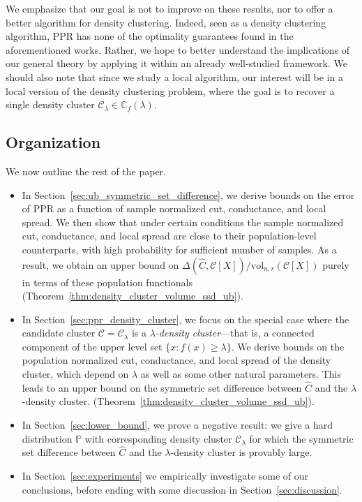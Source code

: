 \documentclass[11pt,twoside]{article}
\theoremstyle{definition}
\newcommand{\1}{\mathbf{1}}
\newcommand{\mc}[1]{\mathcal{#1}}
\newcommand{\Pbb}{\mathbb{P}}
\newcommand{\wh}[1]{\widehat{#1}}
\newcommand{\vol}{\mathrm{vol}}
\begin{document}
We emphasize that our goal is
not to improve on these results, nor to offer a better algorithm for density clustering. Indeed, seen as a density clustering algorithm, PPR has none 
of the optimality guarantees found in the aforementioned works. Rather, we hope to better understand the implications of our general theory by applying it within an already well-studied framework. We should also note that since we study a local algorithm, our interest will be in a local version of the density clustering problem, where the goal is to recover a single density cluster $\mc{C}_{\lambda} \in \mathbb{C}_f(\lambda)$. 

\subsection{Organization}
We now outline the rest of the paper.
\begin{itemize}
	\item In Section~\ref{sec:ub_symmetric_set_difference}, we derive bounds on the error of PPR as a function of sample normalized cut, conductance, and local spread. We then show that under certain conditions the sample normalized cut, conductance, and local spread are close to their population-level counterparts, with high probability for sufficient number of samples. As a result, we obtain an upper bound on $\Delta(\wh{C},\mc{C}[X])/\vol_{n,r}(\mc{C}[X])$ purely in terms of these population functionals (Theorem~\ref{thm:density_cluster_volume_ssd_ub}).
	\item In Section~\ref{sec:ppr_density_cluster}, we focus on the special case where the candidate cluster $\mc{C} = \mc{C}_{\lambda}$ is a \emph{$\lambda$-density cluster}---that is, a connected component of the upper level set $\{x: f(x) \geq \lambda\}$. We derive bounds on the population normalized cut, conductance, and local spread of the density cluster, which depend on $\lambda$ as well as some other natural parameters. This leads to an upper bound on the symmetric set difference between $\wh{C}$ and the $\lambda$-density cluster. (Theorem~\ref{thm:density_cluster_volume_ssd_ub}).
	\item In Section~\ref{sec:lower_bound}, we prove a negative result: we give a hard distribution $\Pbb$ with corresponding density cluster $\mc{C}_{\lambda}$ for which the symmetric set difference between $\wh{C}$ and the $\lambda$-density cluster is provably large.
	\item In Section~\ref{sec:experiments} we empirically investigate some of our conclusions, before ending with some discussion in Section~\ref{sec:discussion}.
\end{itemize}
\end{document}
